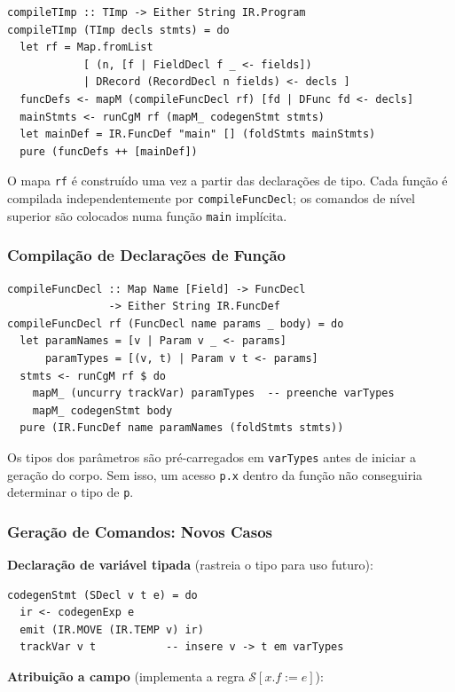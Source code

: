 \begin{verbatim}
compileTImp :: TImp -> Either String IR.Program
compileTImp (TImp decls stmts) = do
  let rf = Map.fromList
            [ (n, [f | FieldDecl f _ <- fields])
            | DRecord (RecordDecl n fields) <- decls ]
  funcDefs <- mapM (compileFuncDecl rf) [fd | DFunc fd <- decls]
  mainStmts <- runCgM rf (mapM_ codegenStmt stmts)
  let mainDef = IR.FuncDef "main" [] (foldStmts mainStmts)
  pure (funcDefs ++ [mainDef])
\end{verbatim}

O mapa \texttt{rf} é construído uma vez a partir das declarações de tipo.
Cada função é compilada independentemente por \texttt{compileFuncDecl};
os comandos de nível superior são colocados numa função \texttt{main}
implícita.

\subsubsection*{Compilação de Declarações de Função}

\begin{verbatim}
compileFuncDecl :: Map Name [Field] -> FuncDecl
                -> Either String IR.FuncDef
compileFuncDecl rf (FuncDecl name params _ body) = do
  let paramNames = [v | Param v _ <- params]
      paramTypes = [(v, t) | Param v t <- params]
  stmts <- runCgM rf $ do
    mapM_ (uncurry trackVar) paramTypes  -- preenche varTypes
    mapM_ codegenStmt body
  pure (IR.FuncDef name paramNames (foldStmts stmts))
\end{verbatim}

Os tipos dos parâmetros são pré-carregados em \texttt{varTypes} antes de
iniciar a geração do corpo. Sem isso, um acesso \texttt{p.x} dentro da
função não conseguiria determinar o tipo de \texttt{p}.

\subsubsection*{Geração de Comandos: Novos Casos}

\textbf{Declaração de variável tipada} (rastreia o tipo para uso futuro):

\begin{verbatim}
codegenStmt (SDecl v t e) = do
  ir <- codegenExp e
  emit (IR.MOVE (IR.TEMP v) ir)
  trackVar v t           -- insere v -> t em varTypes
\end{verbatim}

\textbf{Atribuição a campo} (implementa a regra $\mathcal{S}[x.f:=e]$):

